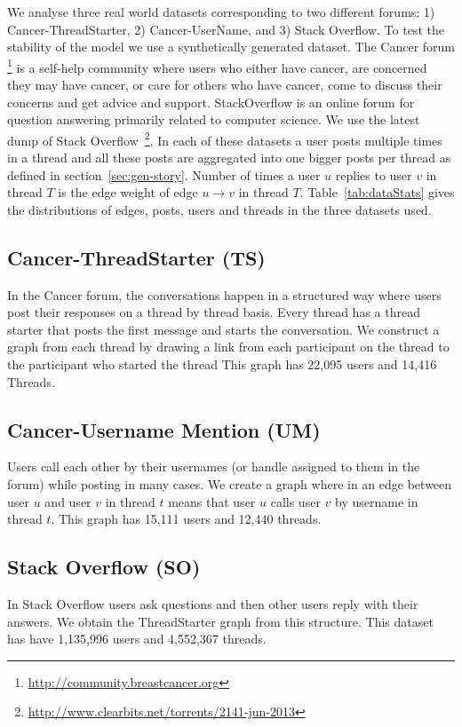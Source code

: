 \documentclass{sig-alternate}
\newcommand{\comment}[1]{\textcolor{red}{[#1]}}
\begin{document}
We analyse three real world datasets corresponding to two different forums: 1)
Cancer-ThreadStarter, 2) Cancer-UserName, and 3) Stack Overflow. To test the
stability of the model we use a synthetically generated dataset. 
The Cancer forum \footnote{\url{http://community.breastcancer.org}} 
is a self-help community where users who either have cancer, are 
concerned they may have cancer, or care for others who have cancer, 
come to discuss their concerns and get advice and support.
StackOverflow is an
online forum for question answering primarily related to computer science. We
use the latest dump of Stack
Overflow~\footnote{\url{http://www.clearbits.net/torrents/2141-jun-2013}}. In
each of these datasets a user posts multiple times in a thread and all these
posts are aggregated into one bigger posts per thread as defined in
section~\ref{sec:gen-story}.
Number of times a user $u$ replies to user $v$ in thread $T$ is the edge weight
of edge $u\rightarrow v$ in thread $T$.
Table~\ref{tab:dataStats} gives the distributions of edges, posts, users and
threads in the three datasets used. 

\subsection{Cancer-ThreadStarter (TS)}
In the Cancer forum, the conversations happen
in a structured way where users post their responses on a thread by thread
basis. Every thread has a thread starter that posts the first message and
starts the conversation. 
We construct a graph from each thread by drawing a link from each participant on 
the thread to the participant who started the thread
This graph has 22,095 users and 14,416 Threads. 
\subsection{Cancer-Username Mention (UM)}
Users call each other by their usernames (or handle assigned to them in the
forum) while posting in many cases. We create a graph where in an edge between
user $u$ and user $v$ in thread $t$ means that user $u$ calls user $v$ by
username in thread $t$. This graph has 15,111 users and
12,440 threads.

\subsection{Stack Overflow (SO)}
In Stack Overflow users ask questions and then other users reply with their
answers. We obtain the ThreadStarter graph from this structure. This dataset has
have 1,135,996 users and 4,552,367 threads.
\end{document}
